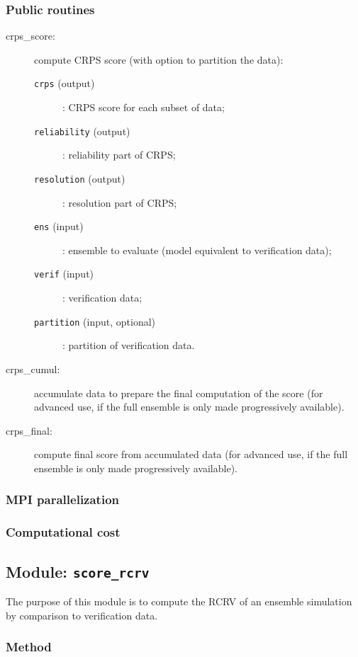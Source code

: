 \documentclass[11pt]{article}
\begin{document}
\subsubsection*{Public routines}

\begin{description}
\item[crps\_score:] compute CRPS score (with option to partition the data):
  \begin{description}
  \item[{\tt crps} (output)]: CRPS score for each subset of data;
  \item[{\tt reliability} (output)]: reliability part of CRPS;
  \item[{\tt resolution} (output)]: resolution part of CRPS;
  \item[{\tt ens} (input)]: ensemble to evaluate (model equivalent to verification data);
  \item[{\tt verif} (input)]: verification data;
  \item[{\tt partition} (input, optional)]: partition of verification data.
  \end{description}
\item[crps\_cumul:] accumulate data to prepare the final computation of the score
                    (for advanced use, if the full ensemble is only made progressively available).
\item[crps\_final:] compute final score from accumulated data
                    (for advanced use, if the full ensemble is only made progressively available).
\end{description}

\subsubsection*{MPI parallelization}

\subsubsection*{Computational cost}

\subsection{Module: {\tt\bf score\_rcrv}}

The purpose of this module is to compute the RCRV
of an ensemble simulation by comparison to verification data.

\subsubsection*{Method}
\end{document}
